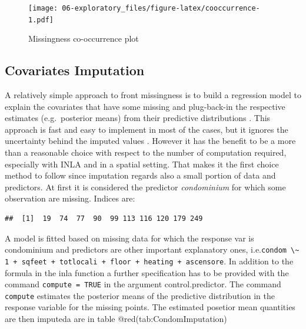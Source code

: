 \documentclass[
  12pt,
  a4paper,
  oneside]{book}
\newcommand{\passthrough}[1]{#1}
\theoremstyle{definition}
\theoremstyle{definition}
\theoremstyle{definition}
\theoremstyle{remark}
\begin{document}
\begin{figure}
\centering
\texttt{[image: 06-exploratory\_files/figure-latex/cooccurrence-1.pdf]}
\caption{\label{fig:cooccurrence}Missingness co-occurrence plot}
\end{figure}

\hypertarget{covariates-imputation}{%
\subsection{Covariates Imputation}\label{covariates-imputation}}

A relatively simple approach to front missingness is to build a regression model to explain the covariates that have some missing and plug-back-in the respective estimates (e.g.~posterior means) from their predictive distributions \citet{Little}. This approach is fast and easy to implement in most of the cases, but it ignores the uncertainty behind the imputed values \citep{Bayesian_INLA_Rubio}. However it has the benefit to be a more than a reasonable choice with respect to the number of computation required, especially with INLA and in a spatial setting. That makes it the first choice method to follow since imputation regards also a small portion of data and predictors. At first it is considered the predictor \emph{condominium} for which some observation are missing. Indices are:

\begin{lstlisting}
##  [1]  19  74  77  90  99 113 116 120 179 249
\end{lstlisting}

A model is fitted based on missing data for which the response var is condominium and predictors are other important explanatory ones, i.e.\passthrough{\lstinline!condom \~ 1 + sqfeet + totlocali + floor + heating + ascensore!}. In addition to the formula in the inla function a further specification has to be provided with the command \passthrough{\lstinline!compute = TRUE!} in the argument control.predictor. The command \passthrough{\lstinline!compute!} estimates the posterior means of the predictive distribution in the response variable for the missing points. The estimated posetior mean quantities are then imputeda are in table @red(tab:CondomImputation)
\end{document}
